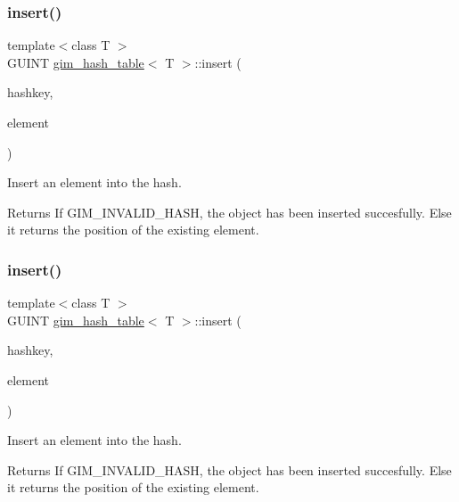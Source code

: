 \subsubsection{\texorpdfstring{insert()}{insert()}\hspace{0.1cm}{\footnotesize\ttfamily [1/2]}}
{\footnotesize\ttfamily template$<$class T $>$ \\
G\+U\+I\+NT \hyperlink{classgim__hash__table}{gim\+\_\+hash\+\_\+table}$<$ T $>$\+::insert (\begin{DoxyParamCaption}\item[{G\+U\+I\+NT}]{hashkey,  }\item[{const T \&}]{element }\end{DoxyParamCaption})\hspace{0.3cm}{\ttfamily [inline]}}



Insert an element into the hash. 

\begin{DoxyReturn}{Returns}
If G\+I\+M\+\_\+\+I\+N\+V\+A\+L\+I\+D\+\_\+\+H\+A\+SH, the object has been inserted succesfully. Else it returns the position of the existing element. 
\end{DoxyReturn}
\mbox{\label{classgim__hash__table_aff0e9bdb5bd6aacf9272db6789c514f7}} 
\subsubsection{\texorpdfstring{insert()}{insert()}\hspace{0.1cm}{\footnotesize\ttfamily [2/2]}}
{\footnotesize\ttfamily template$<$class T $>$ \\
G\+U\+I\+NT \hyperlink{classgim__hash__table}{gim\+\_\+hash\+\_\+table}$<$ T $>$\+::insert (\begin{DoxyParamCaption}\item[{G\+U\+I\+NT}]{hashkey,  }\item[{const T \&}]{element }\end{DoxyParamCaption})\hspace{0.3cm}{\ttfamily [inline]}}



Insert an element into the hash. 

\begin{DoxyReturn}{Returns}
If G\+I\+M\+\_\+\+I\+N\+V\+A\+L\+I\+D\+\_\+\+H\+A\+SH, the object has been inserted succesfully. Else it returns the position of the existing element. 
\end{DoxyReturn}
\mbox{\label{classgim__hash__table_a83987136757654921c71b183de8ec55e}} 
